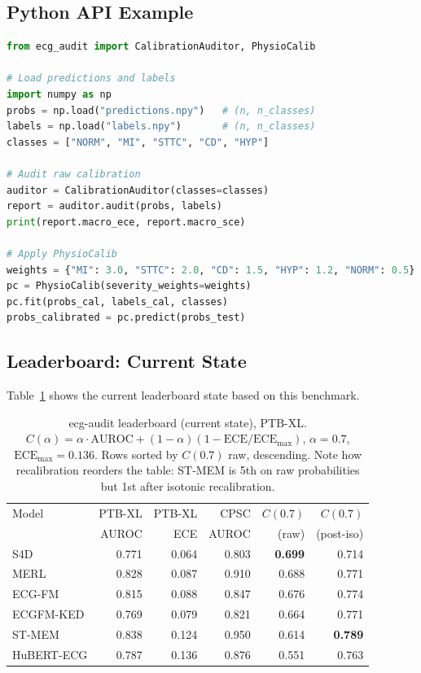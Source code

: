 \subsection{Python API Example}

\begin{lstlisting}[language=python, basicstyle=\ttfamily\small, frame=single]
from ecg_audit import CalibrationAuditor, PhysioCalib

# Load predictions and labels
import numpy as np
probs = np.load("predictions.npy")   # (n, n_classes)
labels = np.load("labels.npy")       # (n, n_classes)
classes = ["NORM", "MI", "STTC", "CD", "HYP"]

# Audit raw calibration
auditor = CalibrationAuditor(classes=classes)
report = auditor.audit(probs, labels)
print(report.macro_ece, report.macro_sce)

# Apply PhysioCalib
weights = {"MI": 3.0, "STTC": 2.0, "CD": 1.5, "HYP": 1.2, "NORM": 0.5}
pc = PhysioCalib(severity_weights=weights)
pc.fit(probs_cal, labels_cal, classes)
probs_calibrated = pc.predict(probs_test)
\end{lstlisting}

\subsection{Leaderboard: Current State}

Table~\ref{tab:leaderboard} shows the current leaderboard state based on this benchmark.

\begin{table}[h]
\centering
\caption{ecg-audit leaderboard (current state), PTB-XL.
  $C(\alpha)=\alpha\cdot\mathrm{AUROC}+(1{-}\alpha)(1{-}\mathrm{ECE}/\mathrm{ECE}_{\max})$,
  $\alpha=0.7$, $\mathrm{ECE}_{\max}=0.136$. Rows sorted by $C(0.7)$ raw, descending.
  Note how recalibration reorders the table: ST-MEM is 5th on raw probabilities but 1st
  after isotonic recalibration.}
\label{tab:leaderboard}
\small
\begin{tabular}{lrrrrr}
\toprule
Model & PTB-XL & PTB-XL & CPSC & $C(0.7)$ & $C(0.7)$ \\
      & AUROC  & ECE    & AUROC & (raw)    & (post-iso) \\
\midrule
S4D        & 0.771 & 0.064 & 0.803 & \textbf{0.699} & 0.714 \\
MERL       & 0.828 & 0.087 & 0.910 & 0.688 & 0.771 \\
ECG-FM     & 0.815 & 0.088 & 0.847 & 0.676 & 0.774 \\
ECGFM-KED  & 0.769 & 0.079 & 0.821 & 0.664 & 0.771 \\
ST-MEM     & 0.838 & 0.124 & 0.950 & 0.614 & \textbf{0.789} \\
HuBERT-ECG & 0.787 & 0.136 & 0.876 & 0.551 & 0.763 \\
\bottomrule
\end{tabular}
\end{table}

